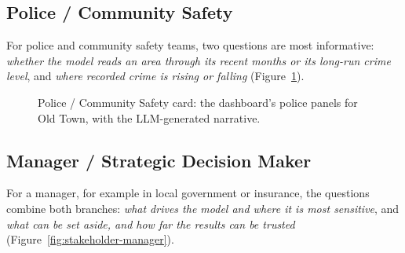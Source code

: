 \clearpage

\subsection{Police / Community Safety}
For police and community safety teams, two questions are most informative: \emph{whether the
model reads an area through its recent months or its long-run crime level}, and \emph{where
recorded crime is rising or falling} (Figure~\ref{fig:stakeholder-police}).\par\medskip
\def\cardtilegroup{policetiles}
\measurecard

\begin{figure}[H]
\def\cardcontent{\begin{tcolorbox}[stakecard]
\setlength{\parskip}{0pt}\raggedright%
{\color{cardMuted}Sensitivity, recent or long-run signals and recorded change}\par\vspace{4pt}
\cardpair{01 \textperiodcentered{} Recent or long-run signal}{Chapter6/figs/dashboard_police_short_E01033104_1.png}
  {02 \textperiodcentered{} Recorded change}{Chapter6/figs/dashboard_police_short_E01033104_2.png}
  {}{\cardSecA}
  {}{\cardSecB}
\vspace{5pt}
\cardtiles
\cardfoot{\cardFooter{} Panels are the dashboard's police view for Old Town (029E).}
\end{tcolorbox}}
\caption{Police / Community Safety card: the dashboard's police panels for Old Town, with the
LLM-generated narrative.}
\label{fig:stakeholder-police}
\end{figure}


\clearpage

\subsection{Manager / Strategic Decision Maker}
For a manager, for example in local government or insurance, the questions combine both
branches: \emph{what drives the model and where it is most sensitive}, and \emph{what can be set
aside, and how far the results can be trusted}
(Figure~\ref{fig:stakeholder-manager}).\par\medskip
\def\cardtilegroup{managertiles}
\measurecard

